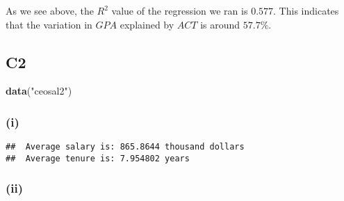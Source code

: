 \documentclass[
]{article}
\newenvironment{Shaded}{\begin{snugshade}}{\end{snugshade}}
\newcommand{\CharTok}[1]{\textcolor[rgb]{0.31,0.60,0.02}{#1}}
\newcommand{\CommentTok}[1]{\textcolor[rgb]{0.56,0.35,0.01}{\textit{#1}}}
\newcommand{\DecValTok}[1]{\textcolor[rgb]{0.00,0.00,0.81}{#1}}
\newcommand{\KeywordTok}[1]{\textcolor[rgb]{0.13,0.29,0.53}{\textbf{#1}}}
\newcommand{\NormalTok}[1]{#1}
\newcommand{\OperatorTok}[1]{\textcolor[rgb]{0.81,0.36,0.00}{\textbf{#1}}}
\newcommand{\StringTok}[1]{\textcolor[rgb]{0.31,0.60,0.02}{#1}}
\begin{document}
As we see above, the \(R^2\) value of the regression we ran is
\(0.577\). This indicates that the variation in \(GPA\) explained by
\(ACT\) is around \(57.7\%\).

\hypertarget{c2}{%
\subsection{C2}\label{c2}}

\begin{Shaded}
\begin{Highlighting}[]
\KeywordTok{data}\NormalTok{(}\StringTok{"ceosal2"}\NormalTok{)}
\end{Highlighting}
\end{Shaded}

\hypertarget{i-3}{%
\subsubsection{(i)}\label{i-3}}

\begin{Shaded}
\end{Shaded}

\begin{verbatim}
##  Average salary is: 865.8644 thousand dollars 
##  Average tenure is: 7.954802 years
\end{verbatim}

\hypertarget{ii-3}{%
\subsubsection{(ii)}\label{ii-3}}

\begin{Shaded}
\end{Shaded}
\end{document}
